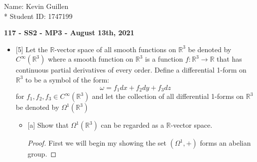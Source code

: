 \documentclass[12pt]{article}
\newcommand      {\Rm}         {{\mathbb R}}
\begin{document}
\begin{flushright}
    Name: Kevin Guillen \\*
    Student ID: 1747199
\end{flushright}
\begin{center}
    {\bf 117 - SS2 - MP3 - August 13th, 2021}
\end{center}

\begin{itemize}
    \item{[5]} Let the $\Rm$-vector space of all smooth functions on $\Rm^3$ be denoted by $C^\infty(\Rm^3)$ where a smooth function on $\Rm^3$ is a
    function $f : \Rm^3 \rightarrow \Rm$ that has continuous partial derivatives of every order. Define a differential 1-form on $\Rm^3$ to be
    a symbol of the form: \[\omega = f_1dx + f_2dy + f_3dz\]
    for $f_1,f_2,f_3\in C^\infty(\Rm^3)$ and let the collection of all differential 1-forms on $\Rm^3$ be denoted by $\Omega^1(\Rm^3)$
    \begin{itemize}
        \item{[a]} Show that $\Omega^1(\Rm^3)$ can be regarded as a $\Rm$-vector space.
        \begin{proof}
                First we will begin my showing the set $(\Omega^1,+)$ forms an abelian group.
                

\end{proof}
\end{itemize}
\end{itemize}
\end{document}
